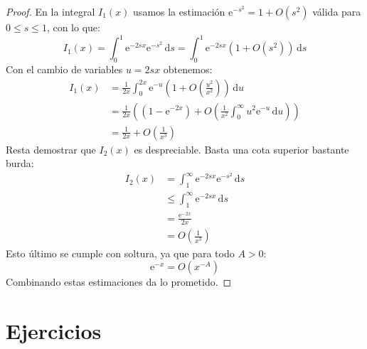 \begin{proof}
   En la integral \(I_1(x)\) usamos la estimación
   \(\mathrm{e}^{-s^2} = 1 + O(s^2)\) válida para \(0 \le s \le 1\),
   con lo que:
   \begin{equation*}
     I_1(x)
       = \int_0^1 \mathrm{e}^{- 2 s x} \mathrm{e}^{-s^2} \, \mathrm{d} s
       = \int_0^1 \mathrm{e}^{- 2 s x} ( 1 + O(s^2) ) \, \mathrm{d} s
   \end{equation*}
   Con el cambio de variables \(u = 2 s x\) obtenemos:
   \begin{align*}
     I_1(x)
       &= \frac{1}{2 x}
            \int_0^{2 x}
              \mathrm{e}^{-u}
                \left(
                  1 + O\left( \frac{u^2}{x^2} \right)
                \right) \, \mathrm{d} u \\
       &= \frac{1}{2 x}
            \left(
               (1 - \mathrm{e}^{- 2 x})
                  + O\left(
                       \frac{1}{x^2}
                         \int_0^\infty u^2 \mathrm{e}^{-u}  \, \mathrm{d} u
                     \right)
            \right) \\
       &= \frac{1}{2 x} + O\left( \frac{1}{x^3} \right)
   \end{align*}
   Resta demostrar que \(I_2(x)\) es despreciable.
   Basta una cota superior bastante burda:
   \begin{align*}
     I_2(x)
       &=   \int_1^\infty
              \mathrm{e}^{- 2 s x} \mathrm{e}^{-s^2} \, \mathrm{d} s \\
       &\le \int_1^\infty
              \mathrm{e}^{- 2 s x} \, \mathrm{d} s \\
       &=   \frac{\mathrm{e}^{-2 x}}{2 x} \\
       &=   O\left( \frac{1}{x^3} \right)
   \end{align*}
   Esto último se cumple con soltura,
   ya que para todo \(A > 0\):
   \begin{equation*}
     \mathrm{e}^{-x}
       = O(x^{-A})
   \end{equation*}
   Combinando estas estimaciones da lo prometido.
  \end{proof}

\section*{Ejercicios}
\label{sec:ex-asymptotics}

